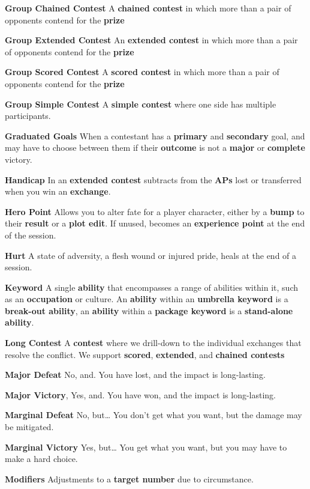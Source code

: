 \documentclass[
]{article}
\begin{document}
\textbf{Group Chained Contest} A \textbf{chained contest} in which more
than a pair of opponents contend for the \textbf{prize}

\textbf{Group Extended Contest} An \textbf{extended contest} in which
more than a pair of opponents contend for the \textbf{prize}

\textbf{Group Scored Contest} A \textbf{scored contest} in which more
than a pair of opponents contend for the \textbf{prize}

\textbf{Group Simple Contest} A \textbf{simple contest} where one side
has multiple participants.

\textbf{Graduated Goals} When a contestant has a \textbf{primary} and
\textbf{secondary} goal, and may have to choose between them if their
\textbf{outcome} is not a \textbf{major} or \textbf{complete} victory.

\textbf{Handicap} In an \textbf{extended contest} subtracts from the
\textbf{APs} lost or transferred when you win an \textbf{exchange}.

\textbf{Hero Point} Allows you to alter fate for a player character,
either by a \textbf{bump} to their \textbf{result} or a \textbf{plot
edit}. If unused, becomes an \textbf{experience point} at the end of the
session.

\textbf{Hurt} A state of adversity, a flesh wound or injured pride,
heals at the end of a session.

\textbf{Keyword} A single \textbf{ability} that encompasses a range of
abilities within it, such as an \textbf{occupation} or culture. An
\textbf{ability} within an \textbf{umbrella keyword} is a
\textbf{break-out ability}, an \textbf{ability} within a \textbf{package
keyword} is a \textbf{stand-alone ability}.

\textbf{Long Contest} A \textbf{contest} where we drill-down to the
individual exchanges that resolve the conflict. We support
\textbf{scored}, \textbf{extended}, and \textbf{chained contests}

\textbf{Major Defeat} No, and. You have lost, and the impact is
long-lasting.

\textbf{Major Victory}, Yes, and. You have won, and the impact is
long-lasting.

\textbf{Marginal Defeat} No, but\ldots{} You don't get what you want,
but the damage may be mitigated.

\textbf{Marginal Victory} Yes, but\ldots{} You get what you want, but
you may have to make a hard choice.

\textbf{Modifiers} Adjustments to a \textbf{target number} due to
circumstance.
\end{document}

